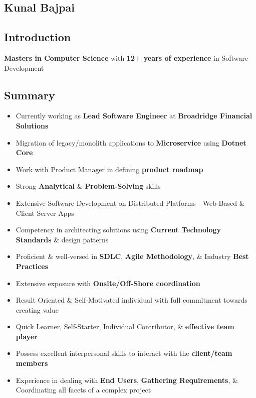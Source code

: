 \documentclass[letterpaper,10pt]{article}
\begin{document}
\begin{center}
\section{Kunal Bajpai}
\end{center}

\subsection{Introduction}
\textbf{Masters in Computer Science} with \textbf{12+ years of experience} in Software Development

\subsection{Summary}
\begin{itemize}
    \item Currently working as \textbf{Lead Software Engineer} at \textbf{Broadridge Financial Solutions}
    \item Migration of legacy/monolith applications to \textbf{Microservice} using \textbf{Dotnet Core}
    \item Work with Product Manager in defining \textbf{product roadmap}
    \item Strong \textbf{Analytical} \& \textbf{Problem-Solving} skills
    \item Extensive Software Development on Distributed Platforms - Web Based \& Client Server Apps
    \item Competency in architecting solutions using \textbf{Current Technology Standards} \& design patterns
    \item Proficient \& well-versed in \textbf{SDLC}, \textbf{Agile Methodology}, \& Industry \textbf{Best Practices}
    \item Extensive exposure with \textbf{Onsite/Off-Shore coordination}
    \item Result Oriented \& Self-Motivated individual with full commitment towards creating value
    \item Quick Learner, Self-Starter, Individual Contributor, \& \textbf{effective team player}
    \item Possess excellent interpersonal skills to interact with the \textbf{client/team members}
    \item Experience in dealing with \textbf{End Users}, \textbf{Gathering Requirements}, \& Coordinating all facets of a complex project
\end{itemize}
\end{document}
